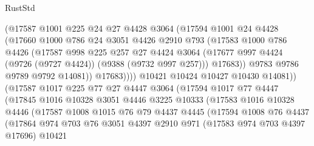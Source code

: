 \begin{lexlean}{RustStd}
\begin{coremodule}
                      (@17587
                        @1001
                        @225
                        @24
                        @27
                        @4428
                        @3064
                        (@17594
                          @1001
                          @24
                          @4428
                          (@17660
                            @1000
                            @786
                            @24
                            @3051
                            @4426
                            @2910
                            @793
                            (@17583
                              @1000
                              @786
                              @4426
                              (@17587
                                @998
                                @225
                                @257
                                @27
                                @4424
                                @3064
                                (@17677 @997 @4424 (@9726 (@9727 @4424)) (@9388 (@9732 @997 @257)))
                                @17683))
                            @9783
                            @9786
                            @9789
                            @9792
                            @14081))
                        @17683))))
                @10421
                @10424
                @10427
                @10430
                @14081))
            (@17587
              @1017
              @225
              @77
              @27
              @4447
              @3064
              (@17594
                @1017
                @77
                @4447
                (@17845
                  @1016
                  @10328
                  @3051
                  @4446
                  @3225
                  @10333
                  (@17583
                    @1016
                    @10328
                    @4446
                    (@17587
                      @1008
                      @1015
                      @76
                      @79
                      @4437
                      @4445
                      (@17594
                        @1008
                        @76
                        @4437
                        (@17864
                          @974
                          @703
                          @76
                          @3051
                          @4397
                          @2910
                          @971
                          (@17583 @974 @703 @4397 @17696)
                          @10421

\end{coremodule}
\end{lexlean}

